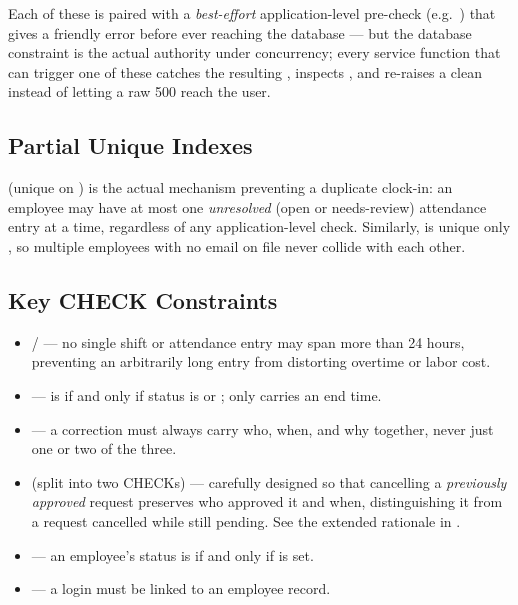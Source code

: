 Each of these is paired with a \emph{best-effort} application-level
pre-check (e.g.\ ) that gives a
friendly error before ever reaching the database --- but the database
constraint is the actual authority under concurrency; every service
function that can trigger one of these catches the resulting
, inspects ,
and re-raises a clean  instead of letting a raw
500 reach the user.

\subsection*{Partial Unique Indexes}

 (unique on
 ) is the actual
mechanism preventing a duplicate clock-in: an employee may have at most
one \emph{unresolved} (open or needs-review) attendance entry at a
time, regardless of any application-level check. Similarly,
 is unique only
, so multiple employees with no email on
file never collide with each other.

\subsection*{Key CHECK Constraints}

\begin{itemize}[nosep]
  \item {} /
         --- no
        single shift or attendance entry may span more than 24 hours,
        preventing an arbitrarily long entry from distorting overtime
        or labor cost.
  \item {}
        ---  is  if and only if status is
         or ; only  carries
        an end time.
  \item {}
        --- a correction must always carry who, when, and why together,
        never just one or two of the three.
  \item {} (split into two
        CHECKs) --- carefully designed so that cancelling a
        \emph{previously approved} request preserves who approved it and
        when, distinguishing it from a request cancelled while still
        pending. See the extended rationale in
        .
  \item {} ---
        an employee's status is  if and only if
         is set.
  \item {} --- a
         login must be linked to an employee
        record.
\end{itemize}


